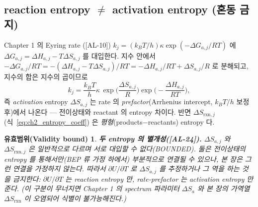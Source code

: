 \documentclass[11pt,a4paper]{article}
\newtheorem*{boundbox}{유효범위(Validity bound)}
\newcommand{\rxn}{\mathrm{rxn}}
\newcommand{\AL}[1]{\textsf{[AL-#1]}}
\begin{document}
\subsection{reaction entropy $\ne$ activation entropy (혼동 금지)}\label{sec:ch2_two_entropy}
Chapter 1 의 Eyring rate \cite{eyring1935}(\AL{10}) $k_j=(k_BT/h)\kappa\exp(-\Delta G_{a,j}/RT)$ 에
$\Delta G_{a,j}=\Delta H_{a,j}-T\Delta S_{a,j}$ 를 대입한다. 지수 안에서 $-\Delta G_{a,j}/RT=
-(\Delta H_{a,j}-T\Delta S_{a,j})/RT=-\Delta H_{a,j}/RT+\Delta S_{a,j}/R$ 로 분해되고, 지수의 합은 지수의
곱이므로
\begin{equation}
k_j=\frac{k_BT}{h}\kappa\,\exp\!\Big(\frac{\Delta S_{a,j}}{R}\Big)\exp\!\Big(-\frac{\Delta H_{a,j}}{RT}\Big),
\label{eq:ch2_eyring_entropy}
\end{equation}
즉 \emph{activation} entropy $\Delta S_{a,j}$ 는 rate 의 \emph{prefactor}(Arrhenius intercept, $k_BT/h$ 보정
후)에서 나온다 — 전이상태와 reactant 의 entropy 차이다. 반면 $\Delta S_{\rxn,j}$(식~\eqref{eq:ch2_entropy_coeff})
은 \emph{평형}(products$-$reactants) entropy 다.
\begin{boundbox}
\textbf{두 entropy 의 별개성(\AL{24}).} $\Delta S_{a,j}$ 와 $\Delta S_{\rxn,j}$ 은 일반적으로 \emph{다르며}
서로 대입할 수 없다(BOUNDED). 둘은 전이상태의 entropy 를 통해서만(BEP 류 가정 하에서) 부분적으로 연결될 수
있으나, 본 장은 그런 연결을 \emph{가정하지 않는다}. 따라서 $\partial U/\partial T$ 로 $\Delta S_{a,j}$ 를
추정하거나 그 역을 하는 것을 금지한다: $\partial U/\partial T$ 는 reaction entropy 만, rate-prefactor 는
activation entropy 만 준다. (이 구분이 무너지면 Chapter 1 의 spectrum 파라미터 $\Delta S_a$ 와 본 장의 가역열
$\Delta S_\rxn$ 이 오염되어 식별이 불가능해진다.)
\end{boundbox}

\end{document}
